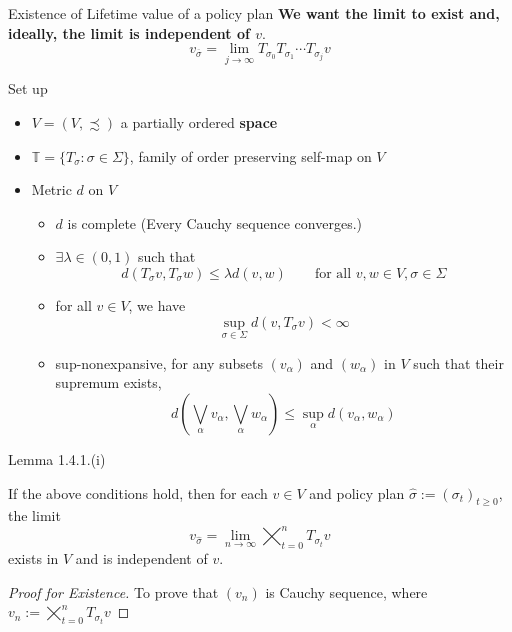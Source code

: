\documentclass[aspectratio=169]{beamer} %
\begin{document}
\begin{frame}{Existence of Lifetime value of a policy plan}
    \textbf{We want the limit to exist and, ideally, the limit is independent of $v$}.
    $$
    v_{\overline{\sigma}} = \lim_{j\to\infty} T_{\sigma_0}T_{\sigma_1}\cdots T_{\sigma_j} v
    $$
\end{frame}
\begin{frame}{Set up}
\begin{itemize}
    \item $V = (V,\precsim)$ a partially ordered \textbf{space} 
    \item $\mathbb{T} = \{T_\sigma:\sigma\in\Sigma\}$, family of order preserving self-map on $V$
    \item Metric $d$ on $V$ 
    \begin{itemize}
        \item $d$ is complete (Every Cauchy sequence converges.)
        \item $\exists \lambda\in(0,1)$ such that
        $$
        d(T_\sigma v, T_\sigma w)\le \lambda d(v,w)\qquad \text{for all $v,w\in V, \sigma\in \Sigma$}
        $$
        \item for all $v\in V$, we have
        $$
        \sup_{\sigma\in\Sigma} d(v,T_\sigma v)<\infty
        $$
        \item sup-nonexpansive, for any subsets $(v_\alpha)$ and $(w_\alpha)$ in $V$ such that their supremum exists, 
        $$
        d\left(\bigvee_\alpha v_\alpha, \bigvee_{\alpha} w_\alpha\right)\le \sup_{\alpha} d(v_\alpha, w_\alpha) 
        $$
    \end{itemize}
\end{itemize}
    
\end{frame}

\begin{frame}{Lemma 1.4.1.(i)}
\begin{lemma}
    If the above conditions hold, then for each $v\in V$ and policy plan $\hat{\sigma}:=(\sigma_t)_{t\ge 0}$, the limit
    $$
    v_{\hat{\sigma}} = \lim_{n\to\infty} \bigtimes_{t=0}^n T_{\sigma_t}v
    $$
    exists in $V$ and is independent of $v$.
\end{lemma}
\begin{proof}[Proof for Existence]
    To prove that $(v_n)$ is Cauchy sequence, where $v_n:= \bigtimes_{t=0}^n T_{\sigma_t}v$
\end{proof}
\end{frame}
\end{document}
